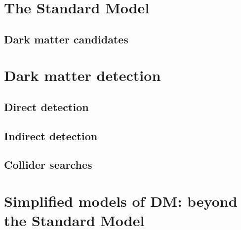 
\section{The Standard Model}
\label{sec:SM}

\subsection{Dark matter candidates}
\label{subsec:DMcandidates}

\section{Dark matter detection}
\label{sec:DMsearches}

\subsection{Direct detection}
\label{subsec:DD}

\subsection{Indirect detection}
\label{subsec:ID}

\subsection{Collider searches}
\label{subsec:Collider}


\section{Simplified models of DM: beyond the Standard Model}
\label{sec:BSM}



